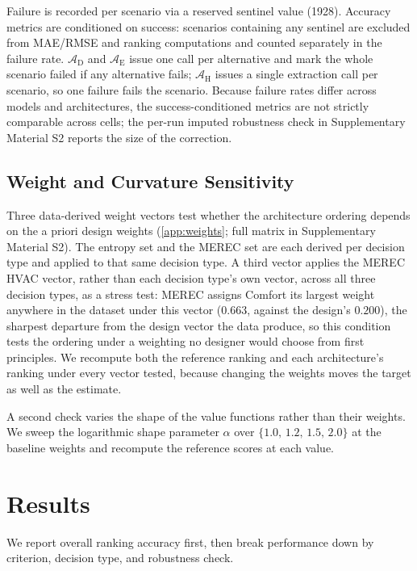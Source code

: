 \documentclass[final,3p,times]{elsarticle}
\begin{document}
Failure is recorded per scenario via a reserved sentinel value (1928). Accuracy metrics are conditioned on success: scenarios containing any sentinel are excluded from MAE/RMSE and ranking computations and counted separately in the failure rate. $\mathcal{A}_{\text{D}}$ and $\mathcal{A}_{\text{E}}$ issue one call per alternative and mark the whole scenario failed if any alternative fails; $\mathcal{A}_{\text{H}}$ issues a single extraction call per scenario, so one failure fails the scenario. Because failure rates differ across models and architectures, the success-conditioned metrics are not strictly comparable across cells; the per-run imputed robustness check in Supplementary Material S2 reports the size of the correction. 


\FloatBarrier
\subsection{Weight and Curvature Sensitivity}
\label{sec:sensitivity-methods}

Three data-derived weight vectors test whether the architecture ordering depends on the a priori design weights (\ref{app:weights}; full matrix in Supplementary Material S2). The entropy set and the MEREC set are each derived per decision type and applied to that same decision type. A third vector applies the MEREC HVAC vector, rather than each decision type's own vector, across all three decision types, as a stress test: MEREC assigns Comfort its largest weight anywhere in the dataset under this vector ($0.663$, against the design's $0.200$), the sharpest departure from the design vector the data produce, so this condition tests the ordering under a weighting no designer would choose from first principles. We recompute both the reference ranking and each architecture's ranking under every vector tested, because changing the weights moves the target as well as the estimate.


A second check varies the shape of the value functions rather than their weights. We sweep the logarithmic shape parameter $\alpha$ over $\{1.0,\,1.2,\,1.5,\,2.0\}$ at the baseline weights and recompute the reference scores at each value.


\FloatBarrier
\section{Results}
\label{sec3}
\label{sec:results}
We report overall ranking accuracy first, then break performance down by criterion, decision type, and robustness check.
\end{document}
